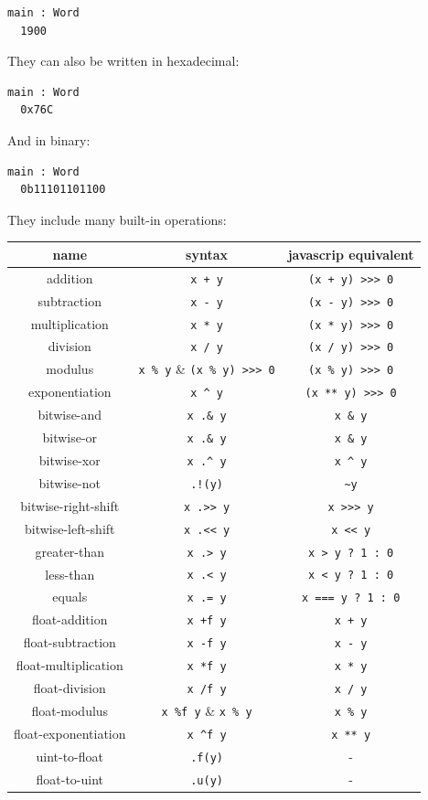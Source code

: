 \documentclass{article}
\theoremstyle{definition}
\theoremstyle{theorem}
\begin{document}
\begin{lstlisting}
main : Word
  1900
\end{lstlisting}

They can also be written in hexadecimal:

\begin{lstlisting}
main : Word
  0x76C
\end{lstlisting}

And in binary:

\begin{lstlisting}
main : Word
  0b11101101100
\end{lstlisting}

They include many built-in operations:

\hfill \newline
\begin{tabular}{ c | c | c}
name & syntax & javascrip equivalent \\\hline
addition & \verb|x + y| & \verb|(x + y) >>> 0|\\
subtraction & \verb|x - y| & \verb|(x - y) >>> 0|\\
multiplication & \verb|x * y| & \verb|(x * y) >>> 0|\\
division & \verb|x / y| & \verb|(x / y) >>> 0|\\
modulus & \verb|x % y| & \verb|(x % y) >>> 0|\\
exponentiation & \verb|x ^ y| & \verb|(x ** y) >>> 0|\\
bitwise-and & \verb|x .& y| & \verb|x & y|\\
bitwise-or & \verb|x .& y| & \verb|x & y|\\
bitwise-xor & \verb|x .^ y| & \verb|x ^ y|\\
bitwise-not & \verb|.!(y)| & \verb|~y|\\
bitwise-right-shift & \verb|x .>> y| & \verb|x >>> y|\\
bitwise-left-shift & \verb|x .<< y| & \verb|x << y|\\
greater-than & \verb|x .> y| & \verb|x > y ? 1 : 0|\\
less-than & \verb|x .< y| & \verb|x < y ? 1 : 0|\\
equals & \verb|x .= y| & \verb|x === y ? 1 : 0|\\
float-addition & \verb|x +f y| & \verb|x + y|\\
float-subtraction & \verb|x -f y| & \verb|x - y|\\
float-multiplication & \verb|x *f y| & \verb|x * y|\\
float-division & \verb|x /f y| & \verb|x / y|\\
float-modulus & \verb|x %f y| & \verb|x % y|\\
float-exponentiation & \verb|x ^f y| & \verb|x ** y|\\
uint-to-float & \verb|.f(y)| & -\\
float-to-uint & \verb|.u(y)| & -\\
\end{tabular}
\\ \hfill \newline
\end{document}
